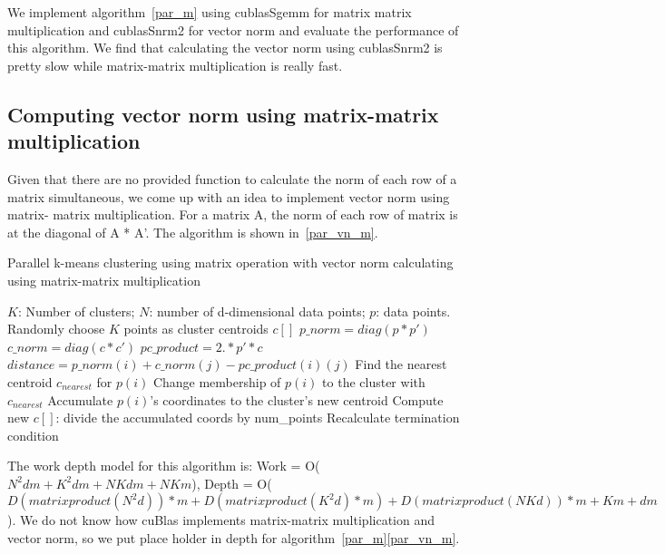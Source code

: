 We implement algorithm~\ref{par_m} using cublasSgemm for matrix matrix multiplication and cublasSnrm2
for vector norm and evaluate the performance of this algorithm.
We find that calculating the vector norm using cublasSnrm2 is pretty slow while matrix-matrix multiplication is really fast.



\subsection{Computing vector norm using matrix-matrix multiplication}
\label{ss:mix}

Given that there are no provided function to calculate the
norm of each row of a matrix simultaneous, we come up with an idea to implement vector norm using matrix-
matrix multiplication. For a matrix A, the norm of each row of matrix is at the diagonal of A * A'. The
algorithm is shown in~\ref{par_vn_m}. 
\begin{algorithm}[!htp]
  \caption{Parallel k-means clustering using matrix operation with vector norm calculating using
    matrix-matrix multiplication} \label{par_vn_m}
  \begin{algorithmic}[1]
    \INPUT $K$: Number of clusters; $N$: number of d-dimensional data points; $p$: data points.
     \label{alg:pm2}
    \State Randomly choose $K$ points as cluster centroids $c[]$
    \State $p\_norm = diag(p * p')$
    \State $c\_norm = diag(c * c')$
    \State $pc\_product = 2 .* p' * c$
    \State $distance = p\_norm(i) + c\_norm(j) - pc\_product(i)(j)$
    \EndFor
    \State Find the nearest centroid $c_{nearest}$ for $p(i)$
    \State Change membership of $p(i)$ to the cluster with $c_{nearest}$
    \State Accumulate $p(i)$'s coordinates to the cluster's new centroid
    \EndParFor
    \State Compute new $c[]$: divide the accumulated coords by num\_points
    \State Recalculate termination condition
    \EndWhile
    \EndFunction
  \end{algorithmic}
\end{algorithm}
The work depth model for this algorithm is: Work = O($N^2dm + K^2dm + NKdm + NKm$),
Depth = O($D(matrix product(N^2d))*m + D(matrix product(K^2d)*m) + D(matrix product(NKd))*m+ Km + dm$).
We do not know how cuBlas implements matrix-matrix multiplication and vector norm, so we put place holder
in depth for algorithm~\ref{par_m}\ref{par_vn_m}. 
